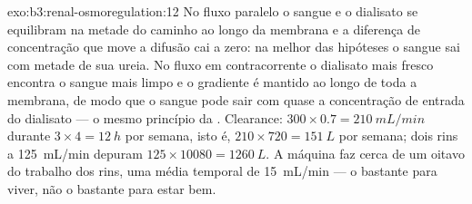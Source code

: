\begin{solution}{exo:b3:renal-osmoregulation:12}
No fluxo paralelo o sangue e o dialisato se equilibram na metade do
caminho ao longo da membrana e a diferença de concentração que move a
difusão cai a zero: na melhor das hipóteses o sangue sai com metade de
sua ureia. No fluxo em contracorrente o dialisato mais fresco encontra o
sangue mais limpo e o gradiente é mantido ao longo de toda a membrana,
de modo que o sangue pode sair com quase a concentração de entrada do
dialisato --- o mesmo princípio da . Clearance: $300\times 0.7 =
\qty{210}{mL/min}$ durante $3\times 4 = \qty{12}{h}$ por semana,
isto é, $210\times 720 = \qty{151}{L}$ por semana; dois rins a
\qty{125}{mL/min} depuram $125\times\num{10080} = \qty{1260}{L}$. A
máquina faz cerca de um oitavo do trabalho dos rins, uma média temporal
de \qty{15}{mL/min} --- o bastante para viver, não o bastante para estar
bem.
\end{solution}

